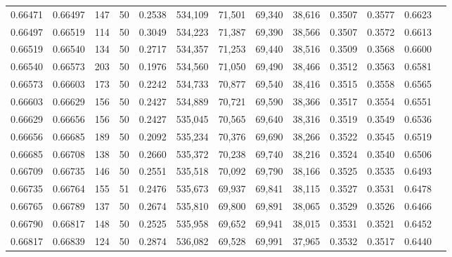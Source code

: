 \begin{tabular}{rrrrrrrrrrrrr}
0.66471 & 0.66497 &   147 &  50 &                                     0.2538 & 534,109 &  71,501 &  69,340 &  38,616 & 0.3507 & 0.3577 & 0.6623 \\
0.66497 & 0.66519 &   114 &  50 &                                     0.3049 & 534,223 &  71,387 &  69,390 &  38,566 & 0.3507 & 0.3572 & 0.6613 \\
0.66519 & 0.66540 &   134 &  50 &                                     0.2717 & 534,357 &  71,253 &  69,440 &  38,516 & 0.3509 & 0.3568 & 0.6600 \\
0.66540 & 0.66573 &   203 &  50 &                                     0.1976 & 534,560 &  71,050 &  69,490 &  38,466 & 0.3512 & 0.3563 & 0.6581 \\
0.66573 & 0.66603 &   173 &  50 &                                     0.2242 & 534,733 &  70,877 &  69,540 &  38,416 & 0.3515 & 0.3558 & 0.6565 \\
0.66603 & 0.66629 &   156 &  50 &                                     0.2427 & 534,889 &  70,721 &  69,590 &  38,366 & 0.3517 & 0.3554 & 0.6551 \\
0.66629 & 0.66656 &   156 &  50 &                                     0.2427 & 535,045 &  70,565 &  69,640 &  38,316 & 0.3519 & 0.3549 & 0.6536 \\
0.66656 & 0.66685 &   189 &  50 &                                     0.2092 & 535,234 &  70,376 &  69,690 &  38,266 & 0.3522 & 0.3545 & 0.6519 \\
0.66685 & 0.66708 &   138 &  50 &                                     0.2660 & 535,372 &  70,238 &  69,740 &  38,216 & 0.3524 & 0.3540 & 0.6506 \\
0.66709 & 0.66735 &   146 &  50 &                                     0.2551 & 535,518 &  70,092 &  69,790 &  38,166 & 0.3525 & 0.3535 & 0.6493 \\
0.66735 & 0.66764 &   155 &  51 &                                     0.2476 & 535,673 &  69,937 &  69,841 &  38,115 & 0.3527 & 0.3531 & 0.6478 \\
0.66765 & 0.66789 &   137 &  50 &                                     0.2674 & 535,810 &  69,800 &  69,891 &  38,065 & 0.3529 & 0.3526 & 0.6466 \\
0.66790 & 0.66817 &   148 &  50 &                                     0.2525 & 535,958 &  69,652 &  69,941 &  38,015 & 0.3531 & 0.3521 & 0.6452 \\
0.66817 & 0.66839 &   124 &  50 &                                     0.2874 & 536,082 &  69,528 &  69,991 &  37,965 & 0.3532 & 0.3517 & 0.6440 \\

\end{tabular}
